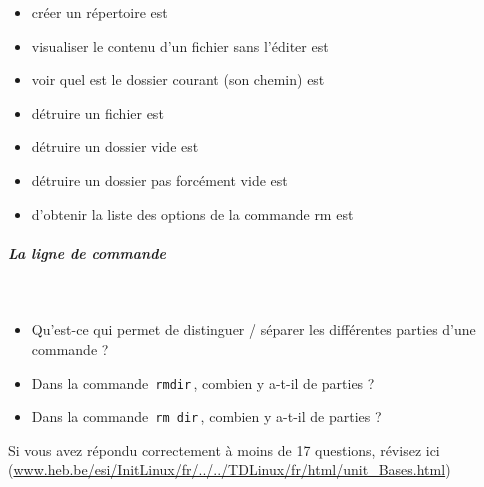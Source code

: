 \documentclass[11pt,a4paper]{article}
\begin{document}
\begin{itemize}
			\item cr\'eer un r\'epertoire est  \textcolor{gray}{\underline{\hspace*{3em}}} 
			\item visualiser le contenu d'un fichier sans l'\'editer est  \textcolor{gray}{\underline{\hspace*{2em}}} 
			\item voir quel est le dossier courant (son chemin) est  \textcolor{gray}{\underline{\hspace*{2em}}} 
			\item d\'etruire un fichier est  \textcolor{gray}{\underline{\hspace*{2em}}} 
			\item d\'etruire un dossier vide est  \textcolor{gray}{\underline{\hspace*{3em}}} 
			\item d\'etruire un dossier pas forc\'ement vide est  \textcolor{gray}{\underline{\hspace*{3em}}} 
			\item d'obtenir la liste des options de la commande rm est  \textcolor{gray}{\underline{\hspace*{5em}}} 
					\end{itemize}
				
			
		\subparagraph{La ligne de commande} 
		
                \textcolor{white}{.} \par
            
					\begin{itemize}
				
			\item 
										Qu'est-ce qui permet de distinguer / s\'eparer les diff\'erentes parties d'une commande ? 
										 \textcolor{gray}{\underline{\hspace*{10em}}} 
			\item 
										Dans la commande \,\verb|rmdir|\,, combien y a-t-il de parties ?  
										 \textcolor{gray}{\underline{\hspace*{1em}}} 
			\item 
										Dans la commande \,\verb|rm dir|\,, combien y a-t-il de parties ?  
										 \textcolor{gray}{\underline{\hspace*{1em}}} 
					\end{itemize}
				Si vous avez r\'epondu correctement \`a moins de 17 questions, r\'evisez ici (\url{www.heb.be/esi/InitLinux/fr/../../TDLinux/fr/html/unit\_Bases.html})
            \par
\end{document}
